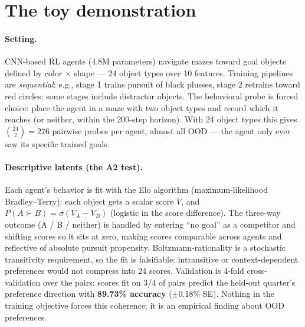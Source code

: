 \documentclass[11pt]{article}
\begin{document}
\section{The toy demonstration}
\label{sec:toy}

\paragraph{Setting.} CNN-based RL agents (4.8M parameters) navigate mazes toward goal objects defined by color $\times$ shape --- 24 object types over 10 features. Training pipelines are \emph{sequential}: e.g., stage 1 trains pursuit of black plusses, stage 2 retrains toward red circles; some stages include distractor objects. The behavioral probe is forced choice: place the agent in a maze with two object types and record which it reaches (or neither, within the 200-step horizon). With 24 object types this gives $\binom{24}{2} = 276$ pairwise probes per agent, almost all OOD --- the agent only ever saw its specific trained goals.

\paragraph{Descriptive latents (the A2 test).} Each agent's behavior is fit with the Elo algorithm (maximum-likelihood Bradley--Terry): each object gets a scalar score $V$, and $P(A \succ B) = \sigma(V_A - V_B)$ (logistic in the score difference). The three-way outcome (A / B / neither) is handled by entering ``no goal'' as a competitor and shifting scores so it sits at zero, making scores comparable across agents and reflective of absolute pursuit propensity. Boltzmann-rationality is a stochastic transitivity requirement, so the fit is falsifiable: intransitive or context-dependent preferences would not compress into 24 scores. Validation is 4-fold cross-validation over the pairs: scores fit on 3/4 of pairs predict the held-out quarter's preference direction with \textbf{89.73\% accuracy} ($\pm$0.18\% SE). Nothing in the training objective forces this coherence; it is an empirical finding about OOD preferences.
\end{document}

